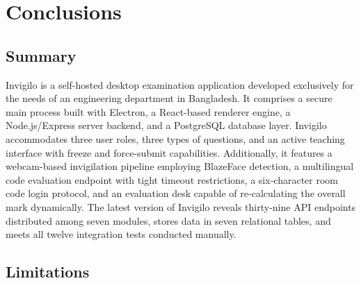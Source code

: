 \documentclass[12pt, a4paper]{report}
\begin{document}
\chapter{Conclusions}

\section{Summary}

\begin{justify}
  {\fontsize{12}{18}\selectfont
    Invigilo is a self-hosted desktop examination application developed exclusively for the needs of an engineering department in Bangladesh. It comprises a secure main process built with Electron, a React-based renderer engine, a Node.js/Express server backend, and a PostgreSQL database layer. Invigilo accommodates three user roles, three types of questions, and an active teaching interface with freeze and force-submit capabilities. Additionally, it features a webcam-based invigilation pipeline employing BlazeFace detection, a multilingual code evaluation endpoint with tight timeout restrictions, a six-character room code login protocol, and an evaluation desk capable of re-calculating the overall mark dynamically. The latest version of Invigilo reveals thirty-nine API endpoints distributed among seven modules, stores data in seven relational tables, and meets all twelve integration tests conducted manually.
  }
\end{justify}

\section{Limitations}
\end{document}
